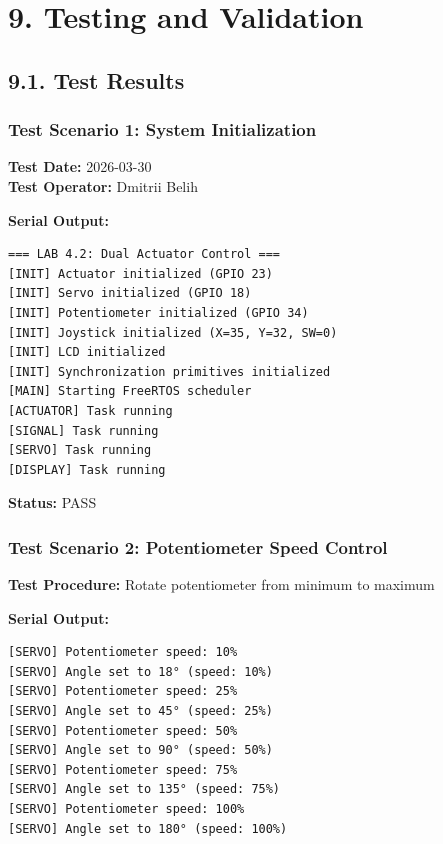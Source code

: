 \documentclass[12pt]{article}
\begin{document}
\section*{9. Testing and Validation}

\subsection*{9.1. Test Results}

\subsubsection*{Test Scenario 1: System Initialization}

\textbf{Test Date:} 2026-03-30 \\
\textbf{Test Operator:} Dmitrii Belih

\textbf{Serial Output:}
\begin{verbatim}
=== LAB 4.2: Dual Actuator Control ===
[INIT] Actuator initialized (GPIO 23)
[INIT] Servo initialized (GPIO 18)
[INIT] Potentiometer initialized (GPIO 34)
[INIT] Joystick initialized (X=35, Y=32, SW=0)
[INIT] LCD initialized
[INIT] Synchronization primitives initialized
[MAIN] Starting FreeRTOS scheduler
[ACTUATOR] Task running
[SIGNAL] Task running
[SERVO] Task running
[DISPLAY] Task running
\end{verbatim}

\textbf{Status:} PASS

\subsubsection*{Test Scenario 2: Potentiometer Speed Control}

\textbf{Test Procedure:} Rotate potentiometer from minimum to maximum

\textbf{Serial Output:}
\begin{verbatim}
[SERVO] Potentiometer speed: 10%
[SERVO] Angle set to 18° (speed: 10%)
[SERVO] Potentiometer speed: 25%
[SERVO] Angle set to 45° (speed: 25%)
[SERVO] Potentiometer speed: 50%
[SERVO] Angle set to 90° (speed: 50%)
[SERVO] Potentiometer speed: 75%
[SERVO] Angle set to 135° (speed: 75%)
[SERVO] Potentiometer speed: 100%
[SERVO] Angle set to 180° (speed: 100%)
\end{verbatim}
\end{document}
